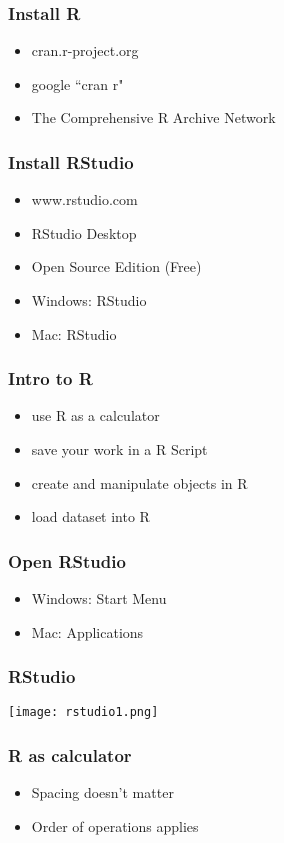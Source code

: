 \documentclass{beamer}
\begin{document}
\begin{frame}
 \frametitle<+->{Install R}
 \begin{itemize}
   \item cran.r-project.org
   \item google ``cran r"
   \item The Comprehensive R Archive Network
 \end{itemize}
\end{frame}

\begin{frame}
 \frametitle<+->{Install RStudio}
 \begin{itemize}
   \item www.rstudio.com
   \item RStudio Desktop
   \item Open Source Edition (Free)
   \item Windows: RStudio %
   \item Mac: RStudio %
 \end{itemize}
\end{frame}

\begin{frame}
 \frametitle<+->{Intro to R}
 \begin{itemize}
   \item use R as a calculator
   \item save your work in a R Script
   \item create and manipulate objects in R
   \item load dataset into R
 \end{itemize}
\end{frame}


\begin{frame}
 \frametitle<+->{Open RStudio}
 \begin{itemize}
   \item Windows: Start Menu
   \item Mac: Applications
 \end{itemize}
\end{frame}

\begin{frame}
 \frametitle{RStudio}
 \texttt{[image: rstudio1.png]}
\end{frame}

\begin{frame}
 \frametitle<+->{R as calculator}
 \begin{itemize}
   \item Spacing doesn't matter
   \item Order of operations applies
 \end{itemize}
\end{frame}
\end{document}
